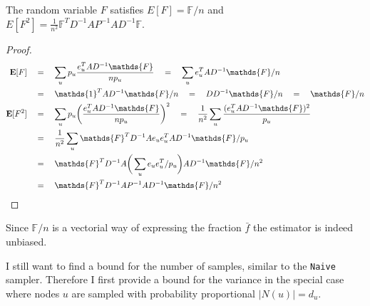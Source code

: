 \begin{lemma}
  The random variable $F$ satisfies $E[F] = \mathds{F}/n$ and \\
  $E[F^2] = \frac{1}{n^2}\mathds{F}^TD^{-1}AP^{-1}AD^{-1}\mathds{F}$.
\end{lemma}
\begin{proof}
\begin{align*}
\textbf{E}[F] \quad&=\quad \sum_u p_u \frac{e_u^TAD^{-1}\mathds{F}}{np_u} \quad=\quad \sum_u e_u^TAD^{-1}\mathds{F}/n \\
&=\quad\mathds{1}^TAD^{-1}\mathds{F}/n \quad=\quad DD^{-1}\mathds{F}/n \quad=\quad \mathds{F}/n \\
\textbf{E}[F^2] \quad&=\quad \sum_u p_u \bigg(\frac{e_u^TAD^{-1}\mathds{F}}{np_u}\bigg)^2 \quad=\quad \frac{1}{n^2}\sum_u \frac{(e_u^TAD^{-1}\mathds{F})^2}{p_u} \\
&=\quad\frac{1}{n^2}\sum_u \mathds{F}^TD^{-1}Ae_ue_u^TAD^{-1}\mathds{F}/p_u \\
&=\quad \mathds{F}^TD^{-1}A\bigg(\sum_ue_ue_u^T/p_u\bigg)AD^{-1}\mathds{F}/n^2 \\
&=\quad \mathds{F}^TD^{-1}AP^{-1}AD^{-1}\mathds{F}/n^2 \qedhere
\end{align*}
\end{proof}
Since $\mathds{F}/n$ is a vectorial way of expressing the fraction $\bar{f}$ the estimator is indeed unbiased.

I still want to find a bound for the number of samples, similar to the \texttt{Naive} sampler.
Therefore I first provide a bound for the variance in the special case where nodes $u$ are sampled with probability proportional $|N(u)| = d_u$.

